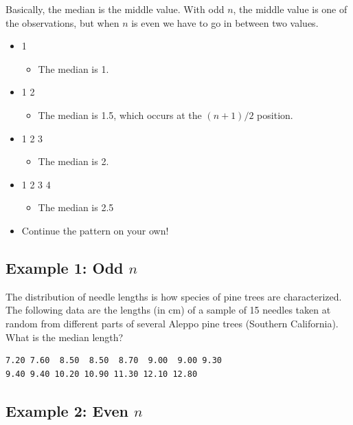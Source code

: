 \documentclass[
  letterpaper,
  DIV=11,
  numbers=noendperiod,
  oneside]{scrreprt}
\providecommand{\tightlist}{%
  \setlength{\itemsep}{0pt}\setlength{\parskip}{0pt}}\usepackage{longtable,booktabs,array}
\begin{document}
Basically, the median is the middle value. With odd \(n\), the middle
value is one of the observations, but when \(n\) is even we have to go
in between two values.

\begin{itemize}
\tightlist
\item
  1

  \begin{itemize}
  \tightlist
  \item
    The median is 1.
  \end{itemize}
\item
  1 2

  \begin{itemize}
  \tightlist
  \item
    The median is 1.5, which occurs at the \((n+1)/2\) position.
  \end{itemize}
\item
  1 2 3

  \begin{itemize}
  \tightlist
  \item
    The median is 2.
  \end{itemize}
\item
  1 2 3 4

  \begin{itemize}
  \tightlist
  \item
    The median is 2.5
  \end{itemize}
\item
  Continue the pattern on your own!
\end{itemize}

\hypertarget{example-1-odd-n}{%
\subsection{\texorpdfstring{Example 1: Odd
\(n\)}{Example 1: Odd n}}\label{example-1-odd-n}}

The distribution of needle lengths is how species of pine trees are
characterized. The following data are the lengths (in cm) of a sample of
15 needles taken at random from different parts of several Aleppo pine
trees (Southern California). What is the median length?

\begin{verbatim}
7.20 7.60  8.50  8.50  8.70  9.00  9.00 9.30
9.40 9.40 10.20 10.90 11.30 12.10 12.80
\end{verbatim}

\hypertarget{example-2-even-n}{%
\subsection{\texorpdfstring{Example 2: Even
\(n\)}{Example 2: Even n}}\label{example-2-even-n}}
\end{document}
